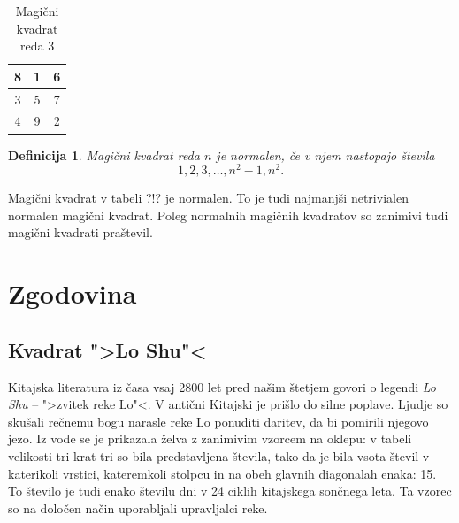 \documentclass[a4paper,12pt]{article}
\newtheorem{definicija}{Definicija}}
\begin{document}

\begin{table}
   \centering
   \caption{Magični kvadrat reda 3}
   \label{table:mag3}
   \large
   \begin{tabular}{|c|c|c|}
      \hline
      8 & 1 & 6 \\\hline
      3 & 5 & 7 \\\hline
      4 & 9 & 2 \\\hline
   \end{tabular}
\end{table}

\begin{definicija}
   Magični kvadrat reda $n$ je \emph{normalen}, če v njem nastopajo števila
   \begin{equation}
      \label{eq:numbers}
      1, 2, 3, \ldots, n^2-1, n^2.
   \end{equation}
\end{definicija}

Magični kvadrat v tabeli ?!? je normalen.
To je tudi najmanjši netrivialen normalen magični kvadrat.
Poleg normalnih magičnih kvadratov so zanimivi tudi magični kvadrati praštevil.


\section{Zgodovina}

\subsection{Kvadrat ">Lo Shu"<}

Kitajska literatura iz časa vsaj 2800 let pred našim štetjem govori o legendi
\emph{Lo Shu} -- ">zvitek reke Lo"<. V antični Kitajski je prišlo do
silne poplave. Ljudje so skušali rečnemu bogu narasle reke Lo ponuditi daritev,
da bi pomirili njegovo jezo. Iz vode se je prikazala želva z zanimivim vzorcem
na oklepu: v tabeli velikosti tri krat tri so bila predstavljena števila, tako
da je bila vsota števil v katerikoli vrstici, kateremkoli stolpcu in na obeh
glavnih diagonalah enaka: 15. To število je tudi enako številu dni v 24 ciklih
kitajskega sončnega leta. Ta vzorec so na določen način uporabljali upravljalci
reke.
\end{document}
